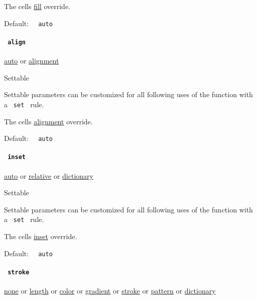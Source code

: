 The cell\textquotesingle s
\href{/docs/reference/layout/grid/\#parameters-fill}{fill} override.

Default: \texttt{\ }{\texttt{\ auto\ }}\texttt{\ }

\paragraph{\texorpdfstring{\texttt{\ align\ }}{ align }}\label{definitions-cell-align}

\href{/docs/reference/foundations/auto/}{auto} {or}
\href{/docs/reference/layout/alignment/}{alignment}

{{ Settable }}

\label{definitions-cell-align-settable-tooltip}
Settable parameters can be customized for all following uses of the
function with a \texttt{\ set\ } rule.

The cell\textquotesingle s
\href{/docs/reference/layout/grid/\#parameters-align}{alignment}
override.

Default: \texttt{\ }{\texttt{\ auto\ }}\texttt{\ }

\paragraph{\texorpdfstring{\texttt{\ inset\ }}{ inset }}\label{definitions-cell-inset}

\href{/docs/reference/foundations/auto/}{auto} {or}
\href{/docs/reference/layout/relative/}{relative} {or}
\href{/docs/reference/foundations/dictionary/}{dictionary}

{{ Settable }}

\label{definitions-cell-inset-settable-tooltip}
Settable parameters can be customized for all following uses of the
function with a \texttt{\ set\ } rule.

The cell\textquotesingle s
\href{/docs/reference/layout/grid/\#parameters-inset}{inset} override.

Default: \texttt{\ }{\texttt{\ auto\ }}\texttt{\ }

\paragraph{\texorpdfstring{\texttt{\ stroke\ }}{ stroke }}\label{definitions-cell-stroke}

\href{/docs/reference/foundations/none/}{none} {or}
\href{/docs/reference/layout/length/}{length} {or}
\href{/docs/reference/visualize/color/}{color} {or}
\href{/docs/reference/visualize/gradient/}{gradient} {or}
\href{/docs/reference/visualize/stroke/}{stroke} {or}
\href{/docs/reference/visualize/pattern/}{pattern} {or}
\href{/docs/reference/foundations/dictionary/}{dictionary}

